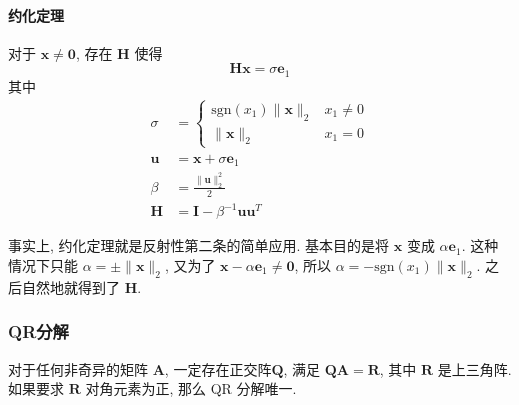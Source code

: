\documentclass{ctexart}
\newcommand{\sgn}{\mathrm{sgn}}
\begin{document}
\paragraph{约化定理}
    对于 $\mathbf{x} \neq \mathbf{0} $, 存在 $ \mathbf{H}$ 使得 \[
        \mathbf{H} \mathbf{x} = \sigma \mathbf{e}_1\]
    其中 \begin{align*}
        \sigma &= \begin{cases}
            \sgn(x_1) \|\mathbf{x} \|_2 & x_1 \neq 0\\
            \|\mathbf{x}\|_2 & x_1  = 0
        \end{cases}\\
        \mathbf{u}& = \mathbf{x} + \sigma \mathbf{e}_1\\
        \beta &= \frac{\|\mathbf{u}\|_2^2}{2}\\
        \mathbf{H} &= \mathbf{I} - \beta^{-1} \mathbf{u} \mathbf{u}^T
    \end{align*}\par
    事实上, 约化定理就是反射性第二条的简单应用.
    基本目的是将 $\mathbf{x}$ 变成 $\alpha \mathbf{e}_1$.
    这种情况下只能 $\alpha = \pm \|\mathbf{x}\|_2$,
    又为了 $\mathbf{x} - \alpha \mathbf{e}_1 \neq \mathbf{0}$,
    所以 $\alpha = -\sgn(x_1) \|\mathbf{x}\|_2$. 之后自然地就得到了 $\mathbf{H}$.
\subsubsection{QR分解}
    对于任何非奇异的矩阵 $\mathbf{A}$, 一定存在正交阵$\mathbf{Q}$,
    满足 $\mathbf{Q} \mathbf{A}=\mathbf{R}$, 其中 $\mathbf{R}$ 是上三角阵.
    如果要求 $ \mathbf{R} $ 对角元素为正, 那么 QR 分解唯一.
\end{document}
